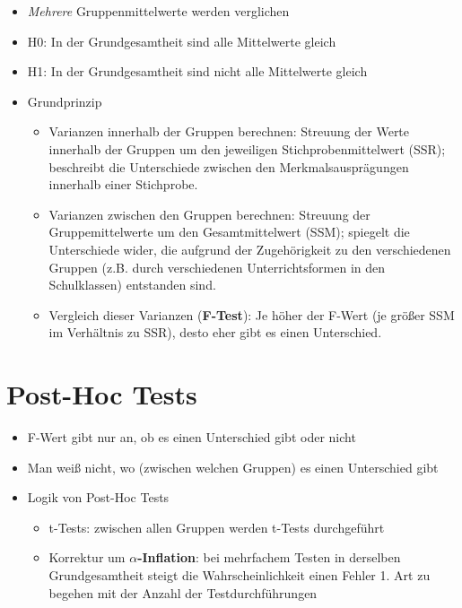 \documentclass[
]{book}
\providecommand{\tightlist}{%
  \setlength{\itemsep}{0pt}\setlength{\parskip}{0pt}}
\begin{document}
\begin{itemize}
\tightlist
\item
  \emph{Mehrere} Gruppenmittelwerte werden verglichen
\item
  H0: In der Grundgesamtheit sind alle Mittelwerte gleich
\item
  H1: In der Grundgesamtheit sind nicht alle Mittelwerte gleich
\item
  Grundprinzip

  \begin{itemize}
  \tightlist
  \item
    Varianzen innerhalb der Gruppen berechnen: Streuung der Werte innerhalb der Gruppen um den jeweiligen Stichprobenmittelwert (SSR); beschreibt die Unterschiede zwischen den Merkmalsausprägungen innerhalb einer Stichprobe.
  \item
    Varianzen zwischen den Gruppen berechnen: Streuung der Gruppemittelwerte um den Gesamtmittelwert (SSM); spiegelt die Unterschiede wider, die aufgrund der Zugehörigkeit zu den verschiedenen Gruppen (z.B. durch verschiedenen Unterrichtsformen in den Schulklassen) entstanden sind.
  \item
    Vergleich dieser Varianzen (\textbf{F-Test}): Je höher der F-Wert (je größer SSM im Verhältnis zu SSR), desto eher gibt es einen Unterschied.
  \end{itemize}
\end{itemize}

\hypertarget{post-hoc-tests}{%
\section{Post-Hoc Tests}\label{post-hoc-tests}}

\begin{itemize}
\tightlist
\item
  F-Wert gibt nur an, ob es einen Unterschied gibt oder nicht
\item
  Man weiß nicht, wo (zwischen welchen Gruppen) es einen Unterschied gibt
\item
  Logik von Post-Hoc Tests

  \begin{itemize}
  \tightlist
  \item
    t-Tests: zwischen allen Gruppen werden t-Tests durchgeführt
  \item
    Korrektur um \textbf{\(\alpha\)-Inflation}: bei mehrfachem Testen in derselben Grundgesamtheit steigt die Wahrscheinlichkeit einen Fehler 1. Art zu begehen mit der Anzahl der Testdurchführungen
  \end{itemize}
\end{itemize}
\end{document}
